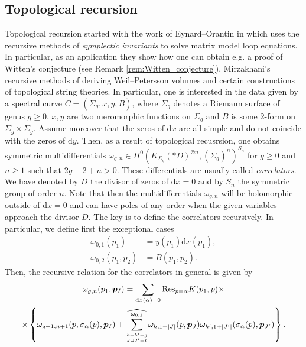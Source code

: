 \documentclass[11pt,colorinlistoftodos]{amsart}
\numberwithin{equation}{subsection}
\theoremstyle{plain}
\theoremstyle{definition}
\theoremstyle{remark}
\newcommand{\dd}{{\mathrm{d}}}
\begin{document}




\subsection{Topological recursion}\label{subsec:topological_recursion}
Topological recursion started with the work of Eynard--Orantin in \cite{EynardOrantin2009} which uses the recursive methods of \emph{symplectic invariants} to solve matrix model loop equations. In particular, as an application they show how one can obtain e.g. a proof of Witten's conjecture (see Remark \ref{rem:Witten_conjecture}), Mirzakhani's recursive methods of deriving Weil--Petersson volumes \cite{Mirzakhani2007} and certain constructions of topological string theories. 
In particular, one is interested in the data given by a spectral curve $C=(\Sigma_g,x,y,B)$, where $\Sigma_g$ denotes a Riemann surface of genus $g\geq 0$, $x,y$ are two meromorphic functions on $\Sigma_g$ and $B$ is some 2-form on $\Sigma_g\times\Sigma_g$. Assume moreover that the zeros of $\dd x$ are all simple and do not coincide with the zeros of $\dd y$. Then, as a result of topological recusrsion, one obtains symmetric multidifferentials $\omega_{g,n}\in H^0(K_{\Sigma_g}(*D)^{\otimes n},(\Sigma_g)^n)^{S_n}$ for $g\geq 0$ and $n\geq 1$ such that $2g-2+n> 0$. These differentials are usually called \emph{correlators}. We have denoted by $D$ the divisor of zeros of $\dd x=0$ and by $S_n$ the symmetric group of order $n$. Note that then the multidifferentials $\omega_{g,n}$ will be holomorphic outside of $\dd x=0$ and can have poles of any order when the given variables approach the divisor $D$. The key is to define the correlators recursively. In particular, we define first the exceptional cases
\begin{align}
    \omega_{0,1}(p_1)&=y(p_1)\dd x(p_1),\\
    \omega_{0,2}(p_1,p_2)&=B(p_1,p_2).
\end{align}
Then, the recursive relation for the correlators in general is given by 
\begin{multline}
\label{eq:multidifferentials}
    \omega_{g,n}(p_1,\boldsymbol{p}_I)=\sum_{\dd x(\alpha)=0}\mathrm{Res}_{p=\alpha} K(p_1,p)\times\\
    \times\left\{\omega_{g-1,n+1}(p,\sigma_\alpha(p),\boldsymbol{p}_I)+\widehat{\sum_{h+h'=g\atop J\sqcup J'=I}^{\omega_{0,1}}}\omega_{h,1+\vert J\vert}(p,\boldsymbol{p}_J)\omega_{h',1+\vert J'\vert}(\sigma_\alpha(p),\boldsymbol{p}_{J'})\right\}.
\end{multline}
\end{document}
